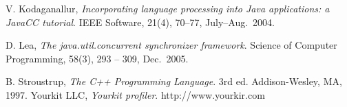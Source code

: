 \documentclass{sigplanconf}
\begin{document}
\begin{thebibliography}{}
    V. Kodaganallur, \emph{Incorporating language processing into Java 
    applications: a JavaCC tutorial}. IEEE Software, 21(4), 70--77,
    July--Aug.~2004. 

    D. Lea, \emph{The java.util.concurrent synchronizer framework}. Science of 
    Computer Programming, 58(3), 293 -- 309, Dec.~2005.

    B. Stroustrup, \emph{The C++ Programming Language}. 3rd ed. Addison-Wesley,
    MA, 1997.
    Yourkit LLC, \emph{Yourkit profiler}. http://www.yourkir.com

\end{thebibliography}
\end{document}

